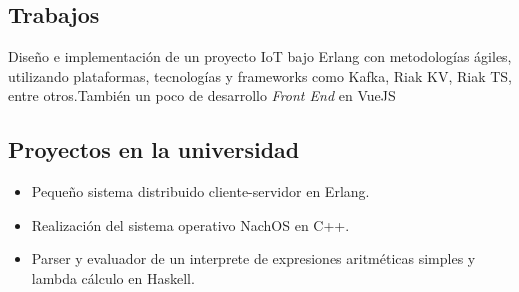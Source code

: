 \documentclass[10pt,a4paper]{moderncv}        %
\begin{document}
  \subsection{Trabajos}
  {Diseño e implementación de un proyecto IoT bajo Erlang con metodologías ágiles,\newline
  {utilizando plataformas, tecnologías y frameworks como Kafka, Riak KV, Riak TS,
  entre otros.\newline También un poco de desarrollo \textit{Front End} en VueJS}
}
  \subsection{Proyectos en la universidad}
    \begin{itemize}
      \item Pequeño sistema distribuido cliente-servidor en Erlang.
      \item Realización del sistema operativo NachOS en C++.
      \item Parser y evaluador de un interprete de expresiones aritméticas simples y lambda cálculo en Haskell.
    \end{itemize}
\end{document}
